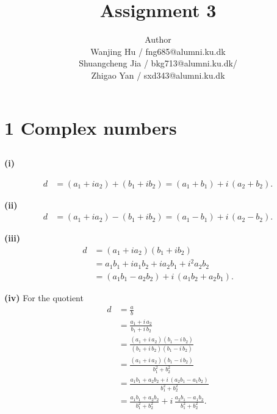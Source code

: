 \documentclass[12pt]{article}
\title{Assignment 3}
\author{Author \\
 Wanjing Hu / fng685@alumni.ku.dk  \\
 Shuangcheng Jia / bkg713@alumni.ku.dk/   \\
 Zhigao Yan / sxd343@alumni.ku.dk  \\
}
\begin{document}
\maketitle

\section{1 Complex numbers}

\subsection{} %

\textbf{(i)} 

\begin{equation}
\begin{aligned}
d &=(a_1 + i a_2) + (b_1 + i b_2) = (a_1 + b_1) + i\,(a_2 + b_2).
\end{aligned}
\end{equation}

\textbf{(ii)}
\begin{equation}
\begin{aligned}
d &=(a_1 + i a_2) - (b_1 + i b_2) = (a_1 - b_1) + i\,(a_2 - b_2).
\end{aligned}
\end{equation}

\textbf{(iii)} 
\begin{equation}
\begin{aligned}
d &=(a_1 + i a_2)(b_1 + i b_2) \\
&= a_1b_1 + i a_1b_2 + i a_2b_1 + i^2 a_2b_2\\
&= (a_1b_1 - a_2b_2) + i\,(a_1b_2 + a_2b_1).
\end{aligned}
\end{equation}

\textbf{(iv)} For the quotient 
\begin{equation}
\begin{aligned}
d &= \frac{a}{b} \\
&= \frac{a_1 + i\,a_2}{b_1 + i\,b_2}\\
&= \frac{(a_1 + i\,a_2)(b_1 - i\,b_2)}{(b_1 + i\,b_2)(b_1 - i\,b_2)}\\
&= \frac{(a_1 + i\,a_2)(b_1 - i\,b_2)}{b_1^2 + b_2^2} \\
&= \frac{a_1b_1 + a_2b_2 + i\,(a_2b_1 - a_1b_2)}{b_1^2 + b_2^2}\\
&= \frac{a_1b_1 + a_2b_2}{b_1^2+b_2^2} + i\,\frac{a_2b_1 - a_1b_2}{b_1^2+b_2^2}.
\end{aligned}
\end{equation}
\end{document}
